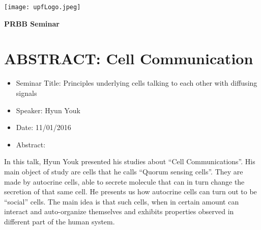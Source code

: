 \documentclass[10pt,letterpaper]{article}
\begin{document}
\vspace{-1cm}
\hspace{-1cm}
\begin{minipage}{.5\textwidth}
    \noindent \texttt{[image: upfLogo.jpeg]} 
\end{minipage}
\hfill
\begin{minipage}{.5\textwidth}
    \flushright
    \textbf{ \Large PRBB Seminar}
\end{minipage}

\vspace{3cm}

\hspace{-1cm}
\vspace{2cm}

\section{ABSTRACT: Cell Communication}
\begin{itemize}
    \item Seminar Title: Principles underlying cells talking to each other with diffusing signals
    \item Speaker: Hyun Youk
    \item Date: 11/01/2016
    \item Abstract:
\end{itemize}

In this talk, Hyun Youk presented his studies about ``Cell Communications''. His main object of study are cells that he calls ``Quorum sensing cells''. They are made by autocrine cells, able to secrete molecule that can in turn change the secretion of that same cell. He presents us how autocrine cells can turn out to be ``social'' cells. The main idea is that such cells, when in certain amount can interact and auto-organize themselves and exhibits properties observed in different part of the human system.
\end{document}
